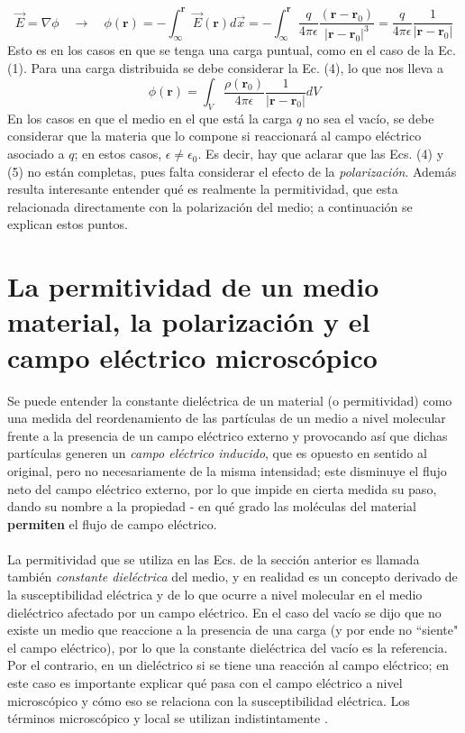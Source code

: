 \documentclass[12pt, oneside, numbers, spanish]{ezthesis}
\numberwithin{equation}{section}
\begin{document}
\begin{equation}
\vec{E} = \nabla\phi \quad\rightarrow\quad\phi{(\mathbf{r})} = -\int_\infty^{\mathbf{r}} \vec{E}(\mathbf{r}) d\vec{x} = -\int_\infty^{\mathbf{r}} \frac{q}{4\pi\epsilon}\frac{(\mathbf{r}-\mathbf{r}_0)}{|\mathbf{r} - \mathbf{r}_0|^3} = \frac{q}{4\pi\epsilon}\frac{1}{|\mathbf{r} - \mathbf{r}_0|}
\end{equation}
Esto es en los casos en que se tenga una carga puntual, como en el caso de la Ec. (1). Para una carga distribuida se debe considerar la Ec. (4), lo que nos lleva a
\begin{equation}
\phi(\mathbf{r}) = \int_V \frac{\rho(\mathbf{r}_0)}{4\pi\epsilon}\frac{1}{|\mathbf{r}-\mathbf{r}_0|}dV
\end{equation}
En los casos en que el medio en el que está la carga $q$ no sea el vacío, se debe considerar que la materia que lo compone si reaccionará al campo eléctrico asociado a $q$; en estos casos, $\epsilon \neq \epsilon_0$. Es decir, hay que aclarar que las Ecs. (4) y (5) no están completas, pues falta considerar el efecto de la \textit{polarización}. Además resulta interesante entender qué es realmente la permitividad, que esta relacionada directamente con la polarización del medio; a continuación se explican estos puntos.
\section{La permitividad de un medio material, la polarización y el campo eléctrico microscópico}
Se puede entender la constante dieléctrica de un material (o permitividad) como una medida del reordenamiento de las partículas de un medio a nivel molecular frente a la presencia de un campo eléctrico externo y provocando así que dichas partículas generen un \textit{campo eléctrico inducido}, que es opuesto en sentido al original, pero no necesariamente de la misma intensidad; este disminuye el flujo neto del campo eléctrico externo, por lo que impide en cierta medida su paso, dando su nombre a la propiedad - en qué grado las moléculas del material \textbf{permiten} el flujo de campo eléctrico.\\\\
La permitividad que se utiliza en las Ecs. de la sección anterior es llamada también \textit{constante dieléctrica} del medio, y en realidad es un concepto derivado de la susceptibilidad eléctrica y de lo que ocurre a nivel molecular en el medio dieléctrico afectado por un campo eléctrico. En el caso del vacío se dijo que no existe un medio que reaccione a la presencia de una carga (y por ende no ``siente" el campo eléctrico), por lo que la constante dieléctrica del vacío es la referencia. Por el contrario, en un dieléctrico si se tiene una reacción al campo eléctrico; en este caso es importante explicar qué pasa con el campo eléctrico a nivel microscópico y cómo eso se relaciona con la susceptibilidad eléctrica. Los términos microscópico y local se utilizan indistintamente \cite{Kantorovich}.
\end{document}
